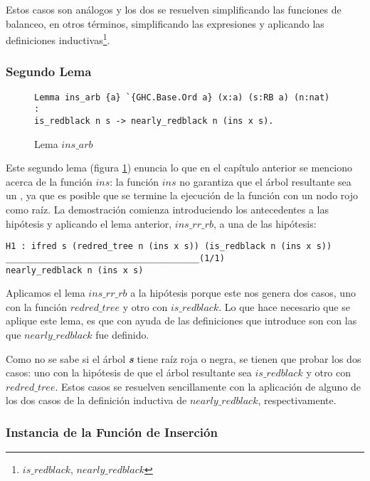 Estos casos son análogos y los dos se resuelven simplificando las funciones de balanceo, en otros términos,
simplificando las expresiones y aplicando las definiciones inductivas\footnote{$is\_redblack$,
$nearly\_redblack$}.

\subsubsection{Segundo Lema}

\begin{figure}[!ht]
\centering
\captionsetup{justification=centering}
\begin{verbatim}
Lemma ins_arb {a} `{GHC.Base.Ord a} (x:a) (s:RB a) (n:nat) :
is_redblack n s -> nearly_redblack n (ins x s).
\end{verbatim}
\caption{Lema $ins\_arb$}
\label{lema_2}
\end{figure}

Este segundo lema (figura \ref{lema_2}) enuncia lo que en el cap\'itulo anterior se menciono acerca
de la funci\'on $ins$: la funci\'on $ins$ no garantiza que el \'arbol resultante sea un {\arn}, ya
que es posible que se termine la ejecuci\'on de la funci\'on con un nodo rojo como raíz. La
demostraci\'on comienza introduciendo los antecedentes a las hipótesis y aplicando el lema
anterior, $ins\_rr\_rb$, a una de las hip\'otesis:

\begin{verbatim}
H1 : ifred s (redred_tree n (ins x s)) (is_redblack n (ins x s))
______________________________________(1/1)
nearly_redblack n (ins x s)

\end{verbatim}

Aplicamos el lema $ins\_rr\_rb$ a la hip\'otesis porque este nos genera dos casos, uno con la 
funci\'on $redred\_tree$ y otro con $is\_redblack$. Lo que hace necesario que se aplique este lema, 
es que con ayuda de las definiciones que introduce son con las que $nearly\_redblack$ fue definido.

Como no se sabe si el \'arbol \textit{\textbf{s}} tiene ra\'iz roja o negra, se tienen que probar 
los dos casos: uno con la hipótesis de que el \'arbol resultante sea $is\_redblack$ y otro con 
$redred\_tree$. Estos casos se resuelven sencillamente con la aplicación de alguno de los dos casos 
de la definici\'on inductiva de $nearly\_redblack$, respectivamente.

\subsubsection{Instancia de la Funci\'on de Inserci\'on}

